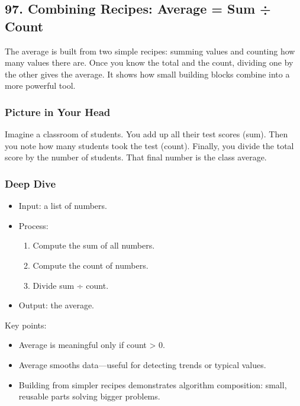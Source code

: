 \documentclass[
  letterpaper,
  DIV=11,
  numbers=noendperiod]{scrreprt}
\providecommand{\tightlist}{%
  \setlength{\itemsep}{0pt}\setlength{\parskip}{0pt}}
\begin{document}
\subsection{97. Combining Recipes: Average = Sum ÷
Count}\label{combining-recipes-average-sum-count}

The average is built from two simple recipes: summing values and
counting how many values there are. Once you know the total and the
count, dividing one by the other gives the average. It shows how small
building blocks combine into a more powerful tool.

\subsubsection{Picture in Your Head}\label{picture-in-your-head-97}

Imagine a classroom of students. You add up all their test scores (sum).
Then you note how many students took the test (count). Finally, you
divide the total score by the number of students. That final number is
the class average.

\subsubsection{Deep Dive}\label{deep-dive-67}

\begin{itemize}
\item
  Input: a list of numbers.
\item
  Process:

  \begin{enumerate}
  \def\labelenumi{\arabic{enumi}.}
  \tightlist
  \item
    Compute the sum of all numbers.
  \item
    Compute the count of numbers.
  \item
    Divide sum ÷ count.
  \end{enumerate}
\item
  Output: the average.
\end{itemize}

Key points:

\begin{itemize}
\tightlist
\item
  Average is meaningful only if count \textgreater{} 0.
\item
  Average smooths data---useful for detecting trends or typical values.
\item
  Building from simpler recipes demonstrates algorithm composition:
  small, reusable parts solving bigger problems.
\end{itemize}
\end{document}
